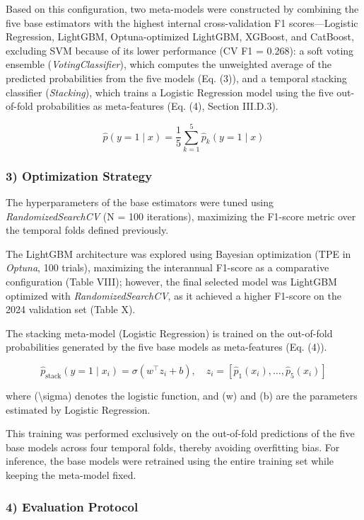 \documentclass[
  number]{elsarticle}
\begin{document}
Based on this configuration, two meta-models were constructed by
combining the five base estimators with the highest internal
cross-validation F1 scores---Logistic Regression, LightGBM,
Optuna-optimized LightGBM, XGBoost, and CatBoost, excluding SVM because
of its lower performance (CV F1 = 0.268): a soft voting ensemble
(\emph{VotingClassifier}), which computes the unweighted average of the
predicted probabilities from the five models (Eq. (3)), and a temporal
stacking classifier (\emph{Stacking}), which trains a Logistic
Regression model using the five out-of-fold probabilities as
meta-features (Eq. (4), Section III.D.3).

\[\hat{p}(y=1 \mid x) = \frac{1}{5}\sum_{k=1}^{5}\hat{p}_k(y=1 \mid x) \tag{3}\]

\subsubsection{3) Optimization Strategy}\label{optimization-strategy}

The hyperparameters of the base estimators were tuned using
\emph{RandomizedSearchCV} (N = 100 iterations), maximizing the F1-score
metric over the temporal folds defined previously.

The LightGBM architecture was explored using Bayesian optimization (TPE
in \emph{Optuna}, 100 trials), maximizing the interannual F1-score as a
comparative configuration (Table VIII); however, the final selected
model was LightGBM optimized with \emph{RandomizedSearchCV}, as it
achieved a higher F1-score on the 2024 validation set (Table X).

The stacking meta-model (Logistic Regression) is trained on the
out-of-fold probabilities generated by the five base models as
meta-features (Eq. (4)).

\[\hat{p}_{\text{stack}}(y=1 \mid x_i) = \sigma\left(w^{\top} z_i + b\right), \quad z_i = \left[\hat{p}_1(x_i), \ldots, \hat{p}_5(x_i)\right] \tag{4}\]

where (\textbackslash sigma) denotes the logistic function, and (w) and
(b) are the parameters estimated by Logistic Regression.

This training was performed exclusively on the out-of-fold predictions
of the five base models across four temporal folds, thereby avoiding
overfitting bias. For inference, the base models were retrained using
the entire training set while keeping the meta-model fixed.

\subsubsection{4) Evaluation Protocol}\label{evaluation-protocol}
\end{document}
